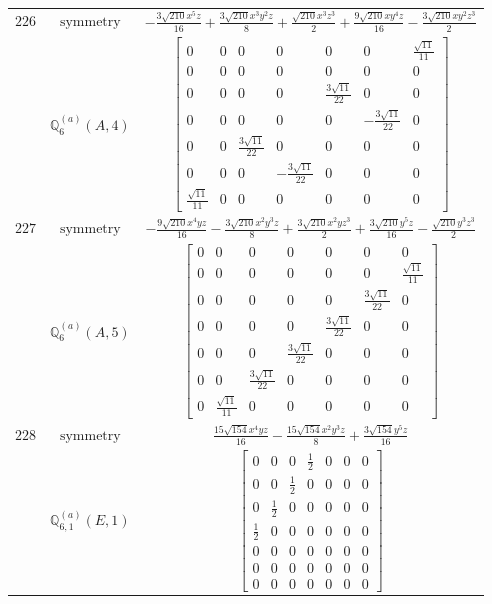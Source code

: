 \documentclass[fleqn,8pt,landscape]{jsarticle}
\begin{document}
\begin{longtable}{ccc}
$ 226 $ & $ \text{symmetry} $ & $ - \frac{3 \sqrt{210} x^{5} z}{16} + \frac{3 \sqrt{210} x^{3} y^{2} z}{8} + \frac{\sqrt{210} x^{3} z^{3}}{2} + \frac{9 \sqrt{210} x y^{4} z}{16} - \frac{3 \sqrt{210} x y^{2} z^{3}}{2} $ \\
$  $ & $ \mathbb{Q}_{6}^{(a)}(A,4) $ & $ \begin{bmatrix} 0 & 0 & 0 & 0 & 0 & 0 & \frac{\sqrt{11}}{11} \\ 0 & 0 & 0 & 0 & 0 & 0 & 0 \\ 0 & 0 & 0 & 0 & \frac{3 \sqrt{11}}{22} & 0 & 0 \\ 0 & 0 & 0 & 0 & 0 & - \frac{3 \sqrt{11}}{22} & 0 \\ 0 & 0 & \frac{3 \sqrt{11}}{22} & 0 & 0 & 0 & 0 \\ 0 & 0 & 0 & - \frac{3 \sqrt{11}}{22} & 0 & 0 & 0 \\ \frac{\sqrt{11}}{11} & 0 & 0 & 0 & 0 & 0 & 0 \end{bmatrix} $ \\ \hline
$ 227 $ & $ \text{symmetry} $ & $ - \frac{9 \sqrt{210} x^{4} y z}{16} - \frac{3 \sqrt{210} x^{2} y^{3} z}{8} + \frac{3 \sqrt{210} x^{2} y z^{3}}{2} + \frac{3 \sqrt{210} y^{5} z}{16} - \frac{\sqrt{210} y^{3} z^{3}}{2} $ \\
$  $ & $ \mathbb{Q}_{6}^{(a)}(A,5) $ & $ \begin{bmatrix} 0 & 0 & 0 & 0 & 0 & 0 & 0 \\ 0 & 0 & 0 & 0 & 0 & 0 & \frac{\sqrt{11}}{11} \\ 0 & 0 & 0 & 0 & 0 & \frac{3 \sqrt{11}}{22} & 0 \\ 0 & 0 & 0 & 0 & \frac{3 \sqrt{11}}{22} & 0 & 0 \\ 0 & 0 & 0 & \frac{3 \sqrt{11}}{22} & 0 & 0 & 0 \\ 0 & 0 & \frac{3 \sqrt{11}}{22} & 0 & 0 & 0 & 0 \\ 0 & \frac{\sqrt{11}}{11} & 0 & 0 & 0 & 0 & 0 \end{bmatrix} $ \\ \hline
$ 228 $ & $ \text{symmetry} $ & $ \frac{15 \sqrt{154} x^{4} y z}{16} - \frac{15 \sqrt{154} x^{2} y^{3} z}{8} + \frac{3 \sqrt{154} y^{5} z}{16} $ \\
$  $ & $ \mathbb{Q}_{6,1}^{(a)}(E,1) $ & $ \begin{bmatrix} 0 & 0 & 0 & \frac{1}{2} & 0 & 0 & 0 \\ 0 & 0 & \frac{1}{2} & 0 & 0 & 0 & 0 \\ 0 & \frac{1}{2} & 0 & 0 & 0 & 0 & 0 \\ \frac{1}{2} & 0 & 0 & 0 & 0 & 0 & 0 \\ 0 & 0 & 0 & 0 & 0 & 0 & 0 \\ 0 & 0 & 0 & 0 & 0 & 0 & 0 \\ 0 & 0 & 0 & 0 & 0 & 0 & 0 \end{bmatrix} $ \\ \hline

\end{longtable}
\end{document}
